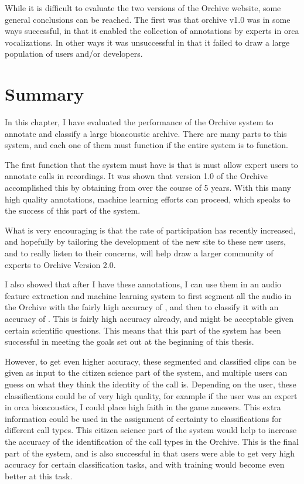 While it is difficult to evaluate the two versions of the Orchive
website, some general conclusions can be reached.  The first was that
orchive v1.0 was in some ways successful, in that it enabled the
collection of \totalAnnotations annotations by experts in orca
vocalizations.  In other ways it was unsuccessful in that it failed to
draw a large population of users and/or developers.


\section{Summary}
\label{sec:evaluation:summary}

In this chapter, I have evaluated the performance of the Orchive
system to annotate and classify a large bioacoustic archive.  There
are many parts to this system, and each one of them must function if
the entire system is to function.

The first function that the system must have is that is must allow
expert users to annotate calls in recordings.  It was shown that
version 1.0 of the Orchive accomplished this by obtaining
\totalAnnotations from \totalExperts over the course of 5 years.  With
this many high quality annotations, machine learning efforts can
proceed, which speaks to the success of this part of the system.

What is very encouraging is that the rate of participation has
recently increased, and hopefully by tailoring the development of the
new site to these new users, and to really listen to their concerns,
will help draw a larger community of experts to Orchive Version 2.0.

I also showed that after I have these annotations, I can use them
in an audio feature extraction and machine learning system to first
segment all the audio in the Orchive with the fairly high accuracy of
\classificationAccuracyOBV, and then to classify it with an accuracy
of \classificationAccuracyCALLS.  This is fairly high accuracy
already, and might be acceptable given certain scientific questions.
This means that this part of the system has been successful in meeting
the goals set out at the beginning of this thesis.

However, to get even higher accuracy, these segmented and classified
clips can be given as input to the citizen science part of the system,
and multiple users can guess on what they think the identity of the
call is.  Depending on the user, these classifications could be of
very high quality, for example if the user was an expert in orca
bioacoustics, I could place high faith in the game answers.  This
extra information could be used in the assignment of certainty to
classifications for different call types.  This citizen science part of the
system would help to increase the accuracy of the identification of
the call types in the Orchive.  This is the final part of the system, and
is also successful in that users were able to get very high accuracy
for certain classification tasks, and with training would become even
better at this task.

